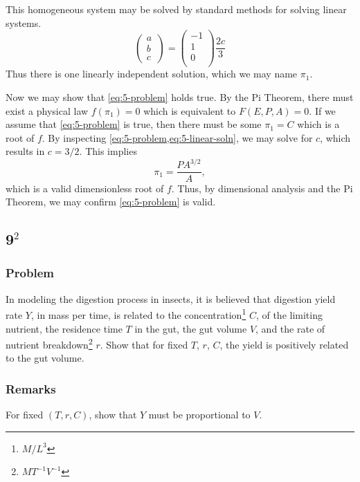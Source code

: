 \documentclass[12pt,twoside]{article}
\begin{document}
  This homogeneous system may be solved by standard methods for solving linear
  systems.
  \begin{equation}
    \label{eq:5-linear-soln}
    \begin{pmatrix}
      a \\ b \\ c \
    \end{pmatrix} =
    \begin{pmatrix}
      -1 \\
      1 \\
      0 \\
    \end{pmatrix}\frac{2c}{3}
  \end{equation}
  Thus there is one linearly independent solution, which we may name $\pi_1$.

  Now we may show that \cref{eq:5-problem} holds true. By the Pi Theorem, there
  must exist a physical law $f(\pi_1)=0$ which is equivalent to $F(E,P,A)=0$. If
  we assume that \cref{eq:5-problem} is true, then there must be some $\pi_1=C$
  which is a root of $f$. By inspecting \cref{eq:5-problem,eq:5-linear-soln}, we
  may solve for $c$, which results in $c=3/2$. This implies
  \begin{equation*}
    \pi_1 = \frac{PA^{3/2}}{A},
  \end{equation*}
  which is a valid dimensionless root of $f$. Thus, by dimensional analysis and
  the Pi Theorem, we may confirm \cref{eq:5-problem} is valid.

\subsection{9$^2$}
  \subsubsection*{Problem}
  In modeling the digestion process in insects, it is believed that digestion
  yield rate $Y$, in mass per time, is related to the
  concentration\footnote{$M/L^3$} $C$, of the limiting nutrient, the residence
  time $T$ in the gut, the gut volume $V$, and the rate of nutrient
  breakdown\footnote{$MT^{-1}V^{-1}$} $r$. Show that for fixed $T$, $r$, $C$,
  the yield is positively related to the gut volume.

  \subsubsection*{Remarks}
  For fixed $(T,r,C)$, show that $Y$ must be proportional to $V$.
\end{document}

